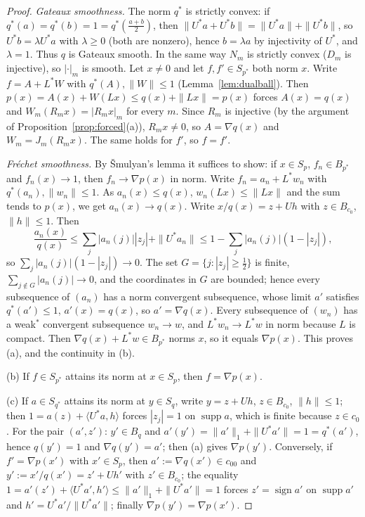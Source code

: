 \documentclass[10pt]{amsart}
\theoremstyle{definition}
\theoremstyle{remark}
\newcommand{\supp}{\operatorname{supp}}
\newcommand{\sgn}{\operatorname{sign}}
\newcommand{\ip}[2]{\langle #1,#2\rangle}
\begin{document}
\begin{proof}
\emph{Gateaux smoothness.}  The norm $q^*$ is strictly convex: if
$q^*(a)=q^*(b)=1=q^*(\frac{a+b}2)$, then $\|U^*a+U^*b\|=\|U^*a\|+\|U^*b\|$, so
$U^*b=\lambda U^*a$ with $\lambda\ge0$ (both are nonzero), hence $b=\lambda a$
by injectivity of $U^*$, and $\lambda=1$.  Thus $q$ is Gateaux smooth.  In
the same way $N_m$ is strictly convex ($D_m$ is injective), so $|\cdot|_m$
is smooth.  Let $x\neq0$ and let $f,f'\in S_{p^*}$ both norm $x$.  Write
$f=A+L^*W$ with $q^*(A),\|W\|\le1$ (Lemma~\ref{lem:dualball}).  Then
$p(x)=A(x)+W(Lx)\le q(x)+\|Lx\|=p(x)$ forces $A(x)=q(x)$ and
$W_m(R_mx)=|R_mx|_m$ for every $m$.  Since $R_m$ is injective (by the
argument of Proposition~\ref{prop:forced}(a)), $R_mx\ne0$, so $A=\nabla q(x)$
and $W_m=J_m(R_mx)$.  The same holds for $f'$, so $f=f'$.

\emph{Fr\'echet smoothness.}  By \v{S}mulyan's lemma it suffices to show:
if $x\in S_p$, $f_n\in B_{p^*}$ and $f_n(x)\to1$, then
$f_n\to\nabla p(x)$ in norm.  Write $f_n=a_n+L^*w_n$ with
$q^*(a_n),\|w_n\|\le1$.  As $a_n(x)\le q(x)$, $w_n(Lx)\le\|Lx\|$ and the
sum tends to $p(x)$, we get $a_n(x)\to q(x)$.  Write $x/q(x)=z+Uh$ with
$z\in B_{c_0}$, $\|h\|\le1$.  Then
\[
 \frac{a_n(x)}{q(x)}\le\sum_j|a_n(j)||z_j|+\|U^*a_n\|
 \le1-\sum_j|a_n(j)|(1-|z_j|),
\]
so $\sum_j|a_n(j)|(1-|z_j|)\to0$.  The set $G=\{j:|z_j|\ge\frac12\}$ is
finite, $\sum_{j\notin G}|a_n(j)|\to0$, and the coordinates in $G$ are
bounded; hence every subsequence of $(a_n)$ has a norm convergent
subsequence, whose limit $a'$ satisfies $q^*(a')\le1$, $a'(x)=q(x)$, so
$a'=\nabla q(x)$.  Every subsequence of $(w_n)$ has a weak$^*$ convergent
subsequence $w_n\to w$, and $L^*w_n\to L^*w$ in norm because $L$ is
compact.  Then $\nabla q(x)+L^*w\in B_{p^*}$ norms $x$, so it equals
$\nabla p(x)$.  This proves (a), and the continuity in (b).

(b) If $f\in S_{p^*}$ attains its norm at $x\in S_p$, then $f=\nabla p(x)$.

(c) If $a\in S_{q^*}$ attains its norm at $y\in S_q$, write $y=z+Uh$,
$z\in B_{c_0}$, $\|h\|\le1$; then $1=a(z)+\ip{U^*a}{h}$ forces
$|z_j|=1$ on $\supp a$, which is finite because $z\in c_0$.  For the
pair $(a',z')$: $y'\in B_q$ and
$a'(y')=\|a'\|_1+\|U^*a'\|=1=q^*(a')$, hence $q(y')=1$ and
$\nabla q(y')=a'$; then (a) gives $\nabla p(y')$.  Conversely, if
$f'=\nabla p(x')$ with $x'\in S_p$, then $a':=\nabla q(x')\in c_{00}$ and
$y':=x'/q(x')=z'+Uh'$ with $z'\in B_{c_0}$; the equality
$1=a'(z')+\ip{U^*a'}{h'}\le\|a'\|_1+\|U^*a'\|=1$ forces $z'=\sgn a'$ on
$\supp a'$ and $h'=U^*a'/\|U^*a'\|$; finally $\nabla p(y')=\nabla p(x')$.
\end{proof}
\end{document}
